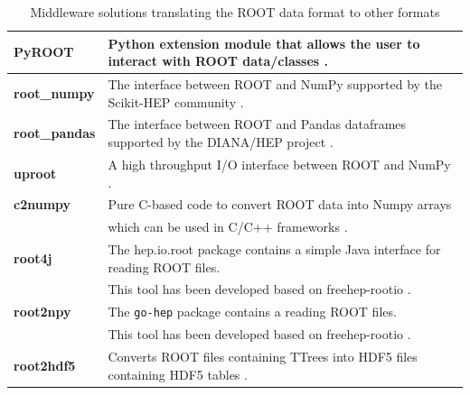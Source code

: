 \begin{table}%
 \caption{Middleware solutions translating the ROOT data format to other formats}
 \begin{center}
  \begin{tabular}{|l|l|}
   \hline
   {\bf PyROOT}       & Python extension module that allows the user to interact with ROOT data/classes \cite{PyROOT}.          \\
   \hline
   {\bf root\_numpy}  & The interface between ROOT and NumPy supported by the Scikit-HEP community \cite{root_numpy}.           \\
   \hline
   {\bf root\_pandas} & The interface between ROOT and Pandas dataframes supported by the DIANA/HEP project \cite{root_pandas}. \\
   \hline
   {\bf uproot}       & A high throughput I/O interface between ROOT and NumPy \cite{uproot}.                                   \\
   \hline
   {\bf c2numpy}      & Pure C-based code to convert ROOT data into Numpy arrays                                                \\
                      & which can be used in C/C++ frameworks \cite{c2numpy}.                                                   \\
   \hline

   {\bf root4j}       & The hep.io.root package contains a simple Java interface for reading ROOT files.                        \\
                      & This tool has been developed based on freehep-rootio \cite{root4j}.                                     \\
   \hline

   {\bf root2npy}     & The \texttt{go-hep} package contains a reading ROOT files.                                              \\
                      & This tool has been developed based on freehep-rootio \cite{root4j}.                                     \\
   \hline

   {\bf root2hdf5}    & Converts ROOT files containing TTrees into HDF5 files containing HDF5 tables \cite{root2hdf5}.          \\
   \hline
  \end{tabular}
 \end{center}
 \label{table:Middleware}
\end{table}



